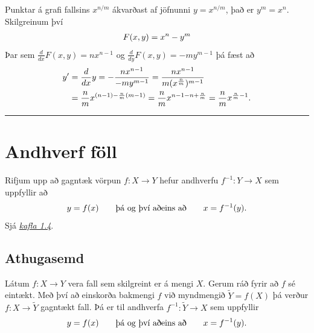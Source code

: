 \documentclass[b5paper,10pt,icelandic]{sphinxmanual}
\begin{document}
Punktar á grafi fallsins \(x^{n/m}\) ákvarðast af jöfnunni \(y=x^{n/m}\), það er
\(y^m = x^n\). Skilgreinum því
\begin{gather}
\begin{split}F(x,y) = x^n-y^m\end{split}\notag
\end{gather}
Þar sem \(\frac d{dx} F(x,y) = nx^{n-1}\) og
\(\frac d{dy} F(x,y) = -my^{m-1}\) þá fæst að
\begin{gather}
\begin{split}\begin{aligned}
y' &= \frac {d}{dx} y =
- \frac{n x^{n-1}}{-m y^{m-1}} =
\frac{n x^{n-1}}{m (x^{\frac nm})^{m-1}} \\
&= \frac nm x^{(n-1) - \frac nm(m-1)}
= \frac nm x^{n-1-n+\frac nm} = \frac nm x^{\frac nm -1}. \end{aligned}\end{split}\notag
\end{gather}

\bigskip\hrule{}\bigskip



\section{Andhverf föll}
\label{kafli03:index-10}\label{kafli03:andhverf-foll}
Rifjum upp að gagntæk vörpun \(f:X\to Y\) hefur andhverfu
\(f^{-1}:Y\to X\) sem uppfyllir að
\begin{gather}
\begin{split}y=f(x)\qquad\mbox{þá og því aðeins að}\qquad x=f^{-1}(y).\end{split}\notag
\end{gather}
Sjá {\hyperref[kafli01:andhverfa]{\emph{kafla 1.4}}}.


\subsection{Athugasemd}
\label{kafli03:athugasemd}
Látum \(f:X \to Y\) vera fall sem skilgreint er á mengi \(X\). Gerum ráð
fyrir að \(f\) sé eintækt. Með því að einskorða bakmengi \(f\) við
myndmengið \(\tilde Y = f(X)\) þá verður \(f:X\to \tilde Y\) gagntækt fall.
Þá er til andhverfa \(f^{-1}:\tilde Y \to X\) sem uppfyllir
\begin{gather}
\begin{split}y=f(x)\qquad\mbox{þá og því aðeins að}\qquad x=f^{-1}(y).\end{split}\notag
\end{gather}
\end{document}
